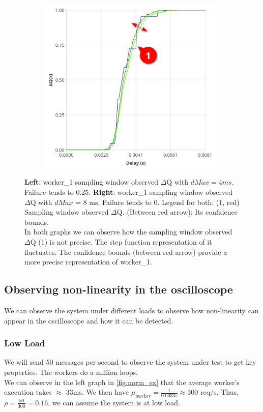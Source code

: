 \begin{figure}[H]
\begin{subfigure}{.5\textwidth}
                \includegraphics[width =0.98\textwidth]{img/overload_2/worker_1_8a.png}
                \label{fig:w18}
            \end{subfigure}
            \caption{\textbf{Left}: worker\_1 sampling window observed $\Delta$Q with $dMax = 4ms$. Failure tends to 0.25. \textbf{Right}: worker\_1 sampling window observed $\Delta$Q with $dMax$ = 8 ms. Failure tends to 0. Legend for both: (1, red) Sampling window observed $\Delta$Q. (Between red arrow): Its confidence bounds.\\
            In both graphs we can observe how the sampling window observed $\Delta$Q (1) is not precise. The step function representation of it fluctuates. The confidence bounds (between red arrow) provide a more precise representation of worker\_1.}%
            \label{fig:w1w2hb}
            \end{figure}
    \subsection{Observing non-linearity in the oscilloscope}
    We can observe the system under different loads to observe how non-linearity can appear in the oscilloscope and how it can be detected. 
    \subsubsection{Low Load} 
   We will send 50 messages per second to observe the system under test to get key properties. The workers do a million loops. \\
    We can observe in the left graph in \cref{fig:norm_ex} that the average worker's execution takes $\approx$ 33ms. We then have $\mu_{worker} = \frac{1}{0.0033 s} \approx 300$ req/s. Thus, $\rho = \frac{50}{300} = 0.1\overline{6}$, we can assume the system is at low load.

